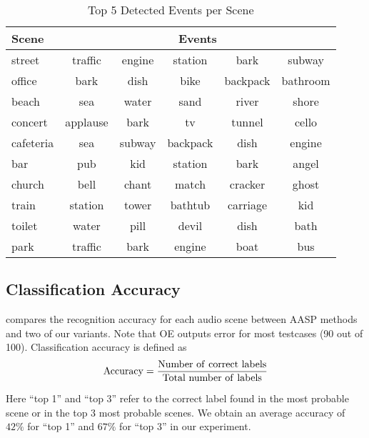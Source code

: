 \begin{table}[th]
\centering
\small
\caption{Top 5 Detected Events per Scene}
\label{tab:te}
\begin{tabular}{l|ccccc}
\toprule
{\bf Scene} & \multicolumn{5}{c}{{\bf Events}}\\
\hline
street & traffic & engine & station & bark & subway\\ \hline
office & bark & dish & bike & backpack & bathroom\\ \hline
beach & sea & water & sand & river & shore\\ \hline
concert & applause & bark & tv & tunnel & cello\\ \hline
cafeteria & sea & subway & backpack & dish & engine\\ \hline
bar & pub & kid & station & bark & angel\\ \hline
church & bell & chant & match & cracker & ghost\\ \hline
train & station & tower & bathtub & carriage & kid\\ \hline
toilet & water & pill & devil & dish & bath\\ \hline
park & traffic & bark & engine & boat & bus\\
\bottomrule
\end{tabular}
\end{table}

\subsection{Classification Accuracy}
 compares the recognition accuracy for each audio scene between
AASP methods and two of our variants.
Note that OE outputs error  for most testcases (90 out of 100).
Classification accuracy is defined as 
\[\rm{Accuracy} = \frac{\rm{Number~ of~ correct~ labels}}{\rm{Total~ number~ of~ labels}}\]

Here ``top 1'' and ``top 3'' refer to the correct label found in the
most probable scene or in the top 3 most probable scenes.
We obtain an average accuracy of $42\%$ for ``top 1'' and $67\%$ for ``top 3''
in our experiment.

